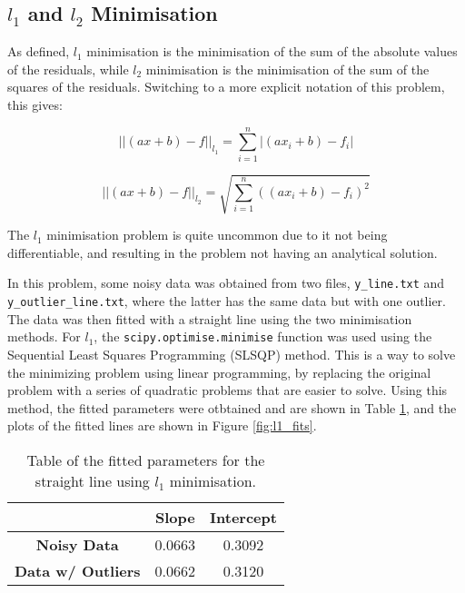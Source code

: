 \documentclass[12pt]{report} %
\begin{document}
\subsection{\texorpdfstring{$l_{1}$ and $l_{2}$ Minimisation}{l1 and l2 Minimisation}}

As defined, $l_{1}$ minimisation is the minimisation of the sum of the absolute values of the residuals\cite{wiki_lad}, while $l_{2}$ minimisation is the minimisation of the sum of the squares of the residuals\cite{margalit2021method}. Switching to a more explicit notation of this problem, this gives:

\begin{equation}
    ||(ax + b) - f||_{l_{1}} = \sum_{i=1}^{n} |(ax_{i} + b) - f_{i}|
\end{equation}

\begin{equation}
    ||(ax + b) - f||_{l_{2}} = \sqrt{\sum_{i=1}^{n} ((ax_{i} + b) - f_{i})^{2}}
\end{equation}

The $l_{1}$ minimisation problem is quite uncommon due to it not being differentiable, and resulting in the problem not having an analytical solution.

In this problem, some noisy data was obtained from two files, \texttt{y\_line.txt} and \texttt{y\_outlier\_line.txt}, where the latter has the same data but with one outlier. The data was then fitted with a straight line using the two minimisation methods. For $l_{1}$, the \texttt{scipy.optimise.minimise} function was used using the Sequential Least Squares Programming (SLSQP) method. This is a way to solve the minimizing problem using linear programming, by replacing the original problem with a series of quadratic problems that are easier to solve\cite{mathse_slsqp}. Using this method, the fitted parameters were otbtained and are shown in Table \ref{tab:l1_fits}, and the plots of the fitted lines are shown in Figure \ref{fig:l1_fits}.

\begin{table}
    \begin{center}
        \begin{tabular}{ccc}
            \hline
            & \textbf{Slope} & \textbf{Intercept} \\
            \hline
            \textbf{Noisy Data} & 0.0663 & 0.3092 \\
            \textbf{Data w/ Outliers} & 0.0662 & 0.3120 \\
            \hline
        \end{tabular}
        \caption{Table of the fitted parameters for the straight line using $l_{1}$ minimisation.}
        \label{tab:l1_fits}
    \end{center}
\end{table}
\end{document}
